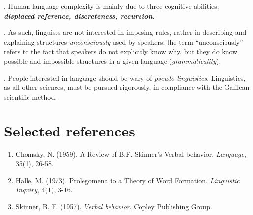 \documentclass[11pt, oneside]{article}   	%
\begin{document}
\ex. Human language complexity is mainly due to three cognitive abilities: {\itshape \bfseries displaced reference, discreteness, recursion}.

\ex. As such, linguists are not interested in imposing rules, rather in describing and explaining structures {\itshape unconsciously} used by speakers; the term ``unconsciously'' refers to the fact that speakers do not explicitly know why, but they do know possible and impossible structures in a given language ({\itshape grammaticality}).

\ex. People interested in language should be wary of {\itshape pseudo-linguistics}. Linguistics, as all other sciences, must be pursued rigorously, in compliance with the Galilean scientific method.

\section{Selected references}

\begin{enumerate}
	\item Chomsky, N. (1959). A Review of B.F. Skinner's Verbal behavior. {\itshape Language}, 35(1), 26-58.
	\item Halle, M. (1973). Prolegomena to a Theory of Word Formation. {\itshape Linguistic Inquiry}, 4(1), 3-16.
	\item Skinner, B. F. (1957). {\itshape Verbal behavior}. Copley Publishing Group.
\end{enumerate}
\end{document}
